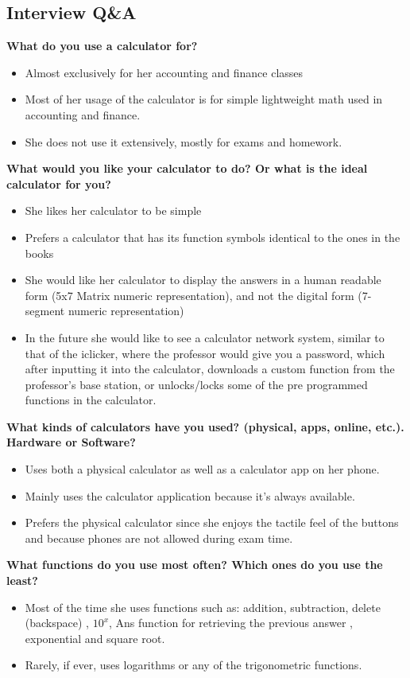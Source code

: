 \documentclass{article}
\begin{document}
\subsection*{Interview Q\&A}
\textbf{What do you use a calculator for?}
\begin{itemize}
\itemsep0em 
\item Almost exclusively for her accounting and finance classes
\item Most of her usage of the calculator is for simple lightweight math used in accounting and finance.
\item She does not use it extensively, mostly for exams and homework.
\end{itemize}

\textbf{What would you like your calculator to do? Or what is the ideal calculator for you?}
\begin{itemize}
\itemsep0em 
\item She likes her calculator to be simple
\item Prefers a calculator that has its function symbols identical to the ones in the books
\item She would like her calculator to display the answers in a human readable form (5x7 Matrix numeric representation), and not the digital form (7-segment numeric representation)
\item In the future she would like to see a calculator network system, similar to that of the iclicker, where the professor would give you a password, which after inputting it into the calculator, downloads a custom function from the professor's base station, or unlocks/locks some of the pre programmed functions in the calculator.
\end{itemize}

\textbf{What kinds of calculators have you used? (physical, apps, online, etc.). Hardware or Software?}
\begin{itemize}
\itemsep0em 
\item Uses both a physical calculator as well as a calculator app on her phone.
\item Mainly uses the calculator application because it’s always available.
\item Prefers the physical calculator since she enjoys the tactile feel of the buttons and because phones are not allowed during exam time.
\end{itemize}

\textbf{What functions do you use most often? Which ones do you use the least?}
\begin{itemize}
\itemsep0em 
\item Most of the time she uses functions such as: addition, subtraction, delete (backspace) , $10^x$, Ans function for retrieving the previous answer , exponential and square root.
\item Rarely, if ever, uses logarithms or any of the trigonometric functions.
\end{itemize}
\end{document}
